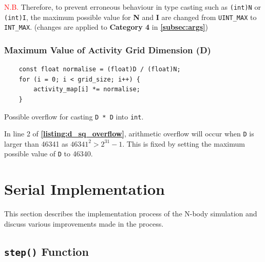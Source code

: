 \documentclass[12pt, a4paper]{article}
\let\oldcref\cref
\renewcommand{\cref}[1]{\textbf{\oldcref{#1}}}
\begin{document}
\textcolor{red}{N.B.} Therefore, to prevent erroneous behaviour in type casting such as
\texttt{(int)N} or \texttt{(int)I}, the maximum possible value for \textbf{N} and
\textbf{I} are changed from \texttt{UINT_MAX} to \texttt{INT_MAX}. (changes are
applied to \textbf{Category 4} in \cref{subsec:args})

\subsubsection{Maximum Value of Activity Grid Dimension (D)} \label{subsec:maxd}
\begin{listing}[ht]
\begin{verbatim}
    const float normalise = (float)D / (float)N;
    for (i = 0; i < grid_size; i++) {
        activity_map[i] *= normalise;
    }
\end{verbatim}
\caption{Possible overflow for casting \texttt{D * D} into \texttt{int}.}
\label{listing:d_sq_overflow}
\end{listing}

In line 2 of \cref{listing:d_sq_overflow}, arithmetic overflow will occur when \texttt{D} is
larger than 46341 as $46341^2 > 2^{31} - 1$. This is fixed by setting the maximum possible value of
\texttt{D} to 46340.

\section{Serial Implementation}
This section describes the implementation process of the N-body simulation and discuss various
improvements made in the process.

\subsection{\texttt{step()} Function}
\end{document}
